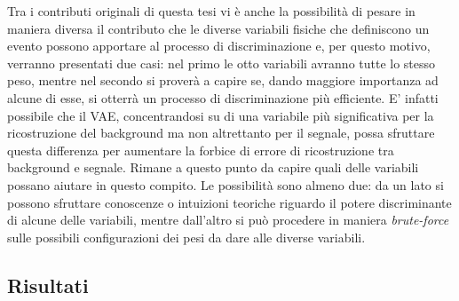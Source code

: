 Tra i contributi originali di questa tesi vi è anche la possibilità di pesare in maniera diversa il contributo che le diverse variabili fisiche che definiscono un evento possono apportare al processo di discriminazione e, per questo motivo, verranno presentati due casi: nel primo le otto variabili avranno tutte lo stesso peso, mentre nel secondo si proverà a capire se, dando maggiore importanza ad alcune di esse, si otterrà un processo di discriminazione più efficiente. E' infatti possibile che il VAE, concentrandosi su di una variabile più significativa per la ricostruzione del background ma non altrettanto per il segnale, possa sfruttare questa differenza per aumentare la forbice di errore di ricostruzione tra background e segnale. Rimane a questo punto da capire quali delle variabili possano aiutare in questo compito. Le possibilità sono almeno due: da un lato si possono sfruttare conoscenze o intuizioni teoriche riguardo il potere discriminante di alcune delle variabili, mentre dall'altro si può procedere in maniera \textit{brute-force} sulle possibili configurazioni dei pesi da dare alle diverse variabili.\\


\newpage


\subsection{Risultati}
\label{risultati}

